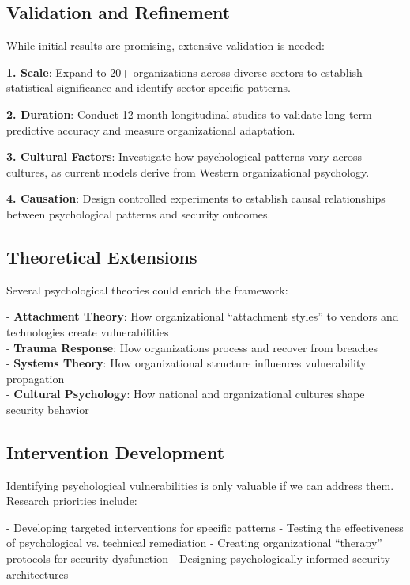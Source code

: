\documentclass[11pt,a4paper]{article}
\begin{document}
\subsection{Validation and Refinement}

While initial results are promising, extensive validation is needed:

\textbf{1. Scale}: Expand to 20+ organizations across diverse sectors to establish statistical significance and identify sector-specific patterns.

\textbf{2. Duration}: Conduct 12-month longitudinal studies to validate long-term predictive accuracy and measure organizational adaptation.

\textbf{3. Cultural Factors}: Investigate how psychological patterns vary across cultures, as current models derive from Western organizational psychology.

\textbf{4. Causation}: Design controlled experiments to establish causal relationships between psychological patterns and security outcomes.

\subsection{Theoretical Extensions}

Several psychological theories could enrich the framework:

- \textbf{Attachment Theory}: How organizational ``attachment styles'' to vendors and technologies create vulnerabilities\\
- \textbf{Trauma Response}: How organizations process and recover from breaches\\
- \textbf{Systems Theory}: How organizational structure influences vulnerability propagation\\
- \textbf{Cultural Psychology}: How national and organizational cultures shape security behavior\\

\subsection{Intervention Development}

Identifying psychological vulnerabilities is only valuable if we can address them. Research priorities include:

- Developing targeted interventions for specific patterns
- Testing the effectiveness of psychological vs. technical remediation
- Creating organizational ``therapy'' protocols for security dysfunction
- Designing psychologically-informed security architectures
\end{document}
